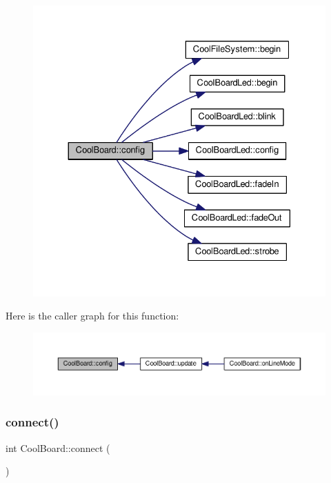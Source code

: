 \begin{figure}[H]
\begin{center}
\leavevmode
\includegraphics[width=330pt]{classCoolBoard_a583a874c09c07e70a6eb9229fc4beddb_cgraph}
\end{center}
\end{figure}
Here is the caller graph for this function\+:
\nopagebreak
\begin{figure}[H]
\begin{center}
\leavevmode
\includegraphics[width=350pt]{classCoolBoard_a583a874c09c07e70a6eb9229fc4beddb_icgraph}
\end{center}
\end{figure}
\mbox{\label{classCoolBoard_a519de78b807f8ec6463ff484eb925918}} 
\subsubsection{\texorpdfstring{connect()}{connect()}}
{\footnotesize\ttfamily int Cool\+Board\+::connect (\begin{DoxyParamCaption}{ }\end{DoxyParamCaption})}

